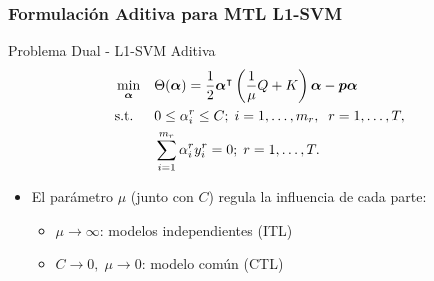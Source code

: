 \documentclass{beamer}
\newcommand{\upper}[1]{\expandafter\MakeUppercase\expandafter{#1}}
\newcommand{\mymat}[1]{\upper{#1}}
\newcommand{\myvec}[1]{\bm{#1}}
\newcommand{\fv}[1]{\myvec{#1}}
\newcommand{\fm}[1]{\mymat{#1}}
\newcommand{\ntasks}{T}
\newcommand{\npertask}{m}
\begin{document}
  
  \begin{frame}
        \frametitle{Formulación Aditiva para MTL L1-SVM}
    
        \begin{block}{Problema Dual - L1-SVM Aditiva}
              \begin{equation}\nonumber
                    \begin{aligned}
                    & \min_{\fv{\alpha}} && \Theta(\fv{\alpha}) = \frac{1}{2} \fv{\alpha}^\intercal \left(\frac{1}{\mu} \fm{Q} + \fm{K} \right) \fv{\alpha} - \fv{p} \fv{\alpha} \\
                    & \text{s.t.}
                    & & 0 \leq \alpha_i^r \leq C ; \; i=1, \ldots, \npertask_r,\;\; r=1, \ldots, \ntasks ,\\
                    & & & \sum_{i=1}^{m_r} \alpha_i^r y_i^r = 0;\;  r=1, \ldots, \ntasks . \\
                    \end{aligned}
                \end{equation}
        \end{block}
        \begin{itemize}
            \item El parámetro $\mu$ (junto con $C$) regula la influencia de cada parte:
            \begin{itemize}
                \item $\mu \to \infty$: modelos independientes (ITL)
                \item $C \to 0,\; \mu \to 0$: modelo común (CTL)
            \end{itemize}
        \end{itemize}
    \end{frame}
  
  
  
\end{document}
